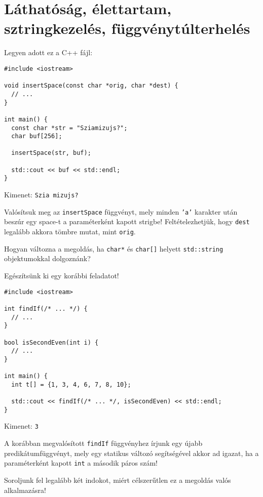 \documentclass[../exercise_book/exercise_book.tex]{subfiles}
\begin{document}
	\section{Láthatóság, élettartam, sztringkezelés, függvénytúlterhelés}
	
	\begin{exercise}
		Legyen adott ez a C++ fájl:
		
		\smallskip
		\begin{lstlisting}
#include <iostream>

void insertSpace(const char *orig, char *dest) {
  // ...
}

int main() {
  const char *str = "Sziamizujs?";
  char buf[256];

  insertSpace(str, buf);

  std::cout << buf << std::endl;
}
		\end{lstlisting}
		Kimenet: \texttt{Szia mizujs?}
		
		\smallskip
		Valósítsuk meg az \texttt{insertSpace} függvényt, mely minden \texttt{'a'} karakter után beszúr egy space-t a paraméterként kapott strigbe! Feltételezhetjük, hogy \texttt{dest} legalább akkora tömbre mutat, mint \texttt{orig}.
		
		\medskip
		Hogyan változna a megoldás, ha \texttt{char*} és \texttt{char[]} helyett \texttt{std::string} objektumokkal dolgoznánk?
	\end{exercise}
	\begin{exercise}
		Egészítsünk ki egy korábbi feladatot!
		
		\smallskip
		\fbox{\textbf{03\_01static\_main.cpp}}
		\begin{lstlisting}
#include <iostream>

int findIf(/* ... */) {
  // ...
}

bool isSecondEven(int i) {
  // ...
}

int main() {
  int t[] = {1, 3, 4, 6, 7, 8, 10};

  std::cout << findIf(/* ... */, isSecondEven) << std::endl;
}
		\end{lstlisting}
		Kimenet: \texttt{3}
		
		\smallskip
		A korábban megvalósított \texttt{findIf} függvényhez írjunk egy újabb predikátumfüggvényt, mely egy statikus változó segítségével akkor ad igazat, ha a paraméterként kapott \texttt{int} a második páros szám! 
		
		\medskip
		Soroljunk fel legalább két indokot, miért célszerűtlen ez a megoldás valós alkalmazásra!
	\end{exercise}
\end{document}
